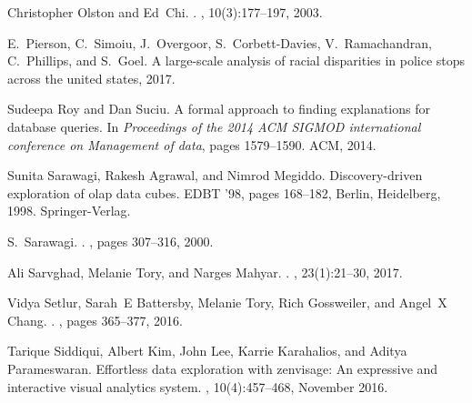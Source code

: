 \documentclass[11pt]{article}
\begin{document}
{\begin{thebibliography}{}
Christopher Olston and Ed~Chi.
.
,
  10(3):177--197, 2003.

E.~Pierson, C.~Simoiu, J.~Overgoor, S.~Corbett-Davies, V.~Ramachandran,
  C.~Phillips, and S.~Goel.
\newblock A large-scale analysis of racial disparities in police stops across
  the united states, 2017.

Sudeepa Roy and Dan Suciu.
\newblock A formal approach to finding explanations for database queries.
\newblock In {\em Proceedings of the 2014 ACM SIGMOD international conference
  on Management of data}, pages 1579--1590. ACM, 2014.

Sunita Sarawagi, Rakesh Agrawal, and Nimrod Megiddo.
\newblock Discovery-driven exploration of olap data cubes.
\newblock EDBT '98, pages 168--182, Berlin, Heidelberg, 1998. Springer-Verlag.

S.~Sarawagi.
.
, pages 307--316, 2000.

Ali Sarvghad, Melanie Tory, and Narges Mahyar.
.
,
  23(1):21--30, 2017.

Vidya Setlur, Sarah~E Battersby, Melanie Tory, Rich Gossweiler, and Angel~X
  Chang.
.
, pages 365--377, 2016.

Tarique Siddiqui, Albert Kim, John Lee, Karrie Karahalios, and Aditya
  Parameswaran.
\newblock Effortless data exploration with zenvisage: An expressive and
  interactive visual analytics system.
, 10(4):457--468, November
  2016.


\end{thebibliography}}
\end{document}
